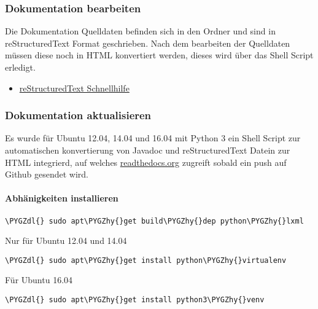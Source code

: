 \documentclass[letterpaper,10pt,ngerman]{sphinxmanual}
\def\PYGZdl{\char`\$}
\def\PYGZhy{\char`\-}
\begin{document}
\subsubsection{Dokumentation bearbeiten}
\label{docs:dokumentation-bearbeiten}
Die Dokumentation Quelldaten befinden sich in den Ordner  und sind in reStructuredText Format geschrieben.
Nach dem bearbeiten der Quelldaten müssen diese noch in HTML konvertiert werden, dieses wird über das Shell Script
 erledigt.
\begin{itemize}
\item {} 
\href{http://docutils.sourceforge.net/docs/user/rst/quickref.html}{reStructuredText Schnellhilfe}

\end{itemize}


\subsubsection{Dokumentation aktualisieren}
\label{docs:dokumentation-aktualisieren}
Es wurde für Ubuntu 12.04, 14.04 und 16.04 mit Python 3 ein Shell Script zur automatischen konvertierung von Javadoc und reStructuredText Datein
zur HTML integrierd, auf welches \href{https://readthedocs.org/}{readthedocs.org} zugreift sobald ein push auf Github gesendet wird.


\paragraph{Abhänigkeiten installieren}
\label{docs:abhanigkeiten-installieren}
\begin{Verbatim}[commandchars=\\\{\}]
\PYGZdl{} sudo apt\PYGZhy{}get build\PYGZhy{}dep python\PYGZhy{}lxml
\end{Verbatim}

Nur für Ubuntu 12.04 und 14.04

\begin{Verbatim}[commandchars=\\\{\}]
\PYGZdl{} sudo apt\PYGZhy{}get install python\PYGZhy{}virtualenv
\end{Verbatim}

Für Ubuntu 16.04

\begin{Verbatim}[commandchars=\\\{\}]
\PYGZdl{} sudo apt\PYGZhy{}get install python3\PYGZhy{}venv
\end{Verbatim}
\end{document}
